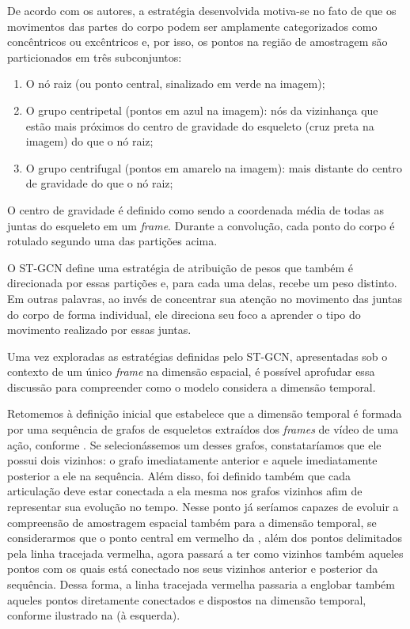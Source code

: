 De acordo com os autores, a estratégia desenvolvida motiva-se no fato de que os movimentos das partes do corpo podem ser amplamente categorizados como concêntricos ou excêntricos e, por isso, os pontos na região de amostragem são particionados em três subconjuntos:

\begin{enumerate}
    \item O nó raiz (ou ponto central, sinalizado em verde na imagem);
    \item O grupo centripetal (pontos em azul na imagem): nós da vizinhança que estão mais próximos do centro de gravidade do esqueleto (cruz preta na imagem) do que o nó raiz;
    \item O grupo centrifugal (pontos em amarelo na imagem): mais distante do centro de gravidade do que o nó raiz;
\end{enumerate}

O centro de gravidade é definido como sendo a coordenada média de todas as juntas do esqueleto em um \textit{frame}. Durante a convolução, cada ponto do corpo é rotulado segundo uma das partições acima.

O ST-GCN define uma estratégia de atribuição de pesos que também é direcionada por essas partições e, para cada uma delas, recebe um peso distinto. Em outras palavras, ao invés de concentrar sua atenção no movimento das juntas do corpo de forma individual, ele direciona seu foco a aprender o tipo do movimento realizado por essas juntas.

Uma vez exploradas as estratégias definidas pelo ST-GCN, apresentadas sob o contexto de um único \textit{frame} na dimensão espacial, é possível aprofudar essa discussão para compreender como o modelo considera a dimensão temporal. 

Retomemos à definição inicial que estabelece que a dimensão temporal é formada por uma sequência de grafos de esqueletos extraídos dos \textit{frames} de vídeo de uma ação, conforme . Se selecionássemos um desses grafos, constataríamos que ele possui dois vizinhos: o grafo imediatamente anterior e aquele imediatamente posterior a ele na sequência. Além disso, foi definido também que cada articulação deve estar conectada a ela mesma nos grafos vizinhos afim de representar sua evolução no tempo. Nesse ponto já seríamos capazes de evoluir a compreensão de amostragem espacial também para a dimensão temporal, se considerarmos que o ponto central em vermelho da , além dos pontos delimitados pela linha tracejada vermelha, agora passará a ter como vizinhos também aqueles pontos com os quais está conectado nos seus vizinhos anterior e posterior da sequência. Dessa forma, a linha tracejada vermelha passaria a englobar também aqueles pontos diretamente conectados e dispostos na dimensão temporal, conforme ilustrado na  (à esquerda).

